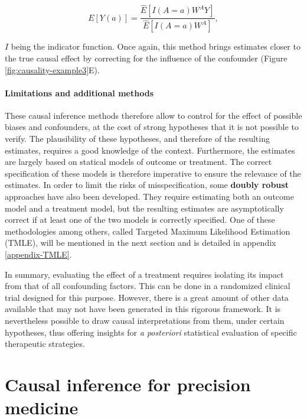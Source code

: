 \documentclass[a4paper,12pt,twoside,onecolumn,openright,final,oldfontcommands]{memoir}
\begin{document}
\begin{equation}
E[Y(a)]=\dfrac{\hat{E}[I(A=a)W^{A}Y]}{\hat{E}[I(A=a)W^A]},
\label{eq:ipweq2}
\end{equation}

\(I\) being the indicator function. Once again, this method brings
estimates closer to the true causal effect by correcting for the
influence of the confounder (Figure \ref{fig:causality-example3}E).

\subsubsection{Limitations and additional
methods}\label{limitations-and-additional-methods}

These causal inference methods therefore allow to control for the effect
of possible biases and confounders, at the cost of strong hypotheses
that it is not possible to verify. The plausibility of these hypotheses,
and therefore of the resulting estimates, requires a good knowledge of
the context. Furthermore, the estimates are largely based on statical
models of outcome or treatment. The correct specification of these
models is therefore imperative to ensure the relevance of the estimates.
In order to limit the risks of misspecification, some \textbf{doubly
robust} approaches have also been developed. They require estimating
both an outcome model and a treatment model, but the resulting estimates
are asymptotically correct if at least one of the two models is
correctly specified. One of these methodologies among others, called
Targeted Maximum Likelihood Estimation (TMLE), will be mentioned in the
next section and is detailed in appendix \ref{appendix-TMLE}.

In summary, evaluating the effect of a treatment requires isolating its
impact from that of all confounding factors. This can be done in a
randomized clinical trial designed for this purpose. However, there is a
great amount of other data available that may not have been generated in
this rigorous framework. It is nevertheless possible to draw causal
interpretations from them, under certain hypotheses, thus offering
insights for \emph{a posteriori} statistical evaluation of specific
therapeutic strategies.

\chapter{Causal inference for precision
medicine}\label{chapter-precision}
\end{document}
